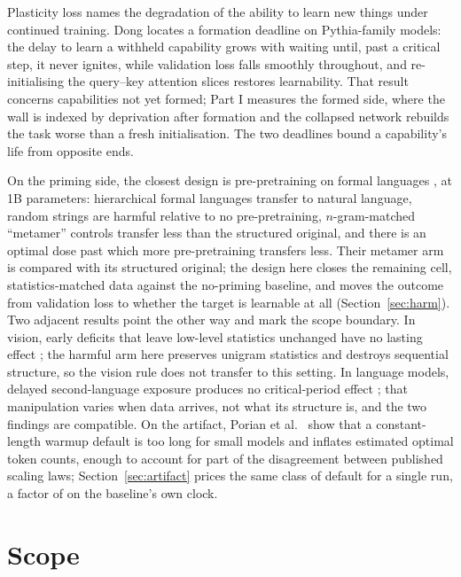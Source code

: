 \documentclass{article}
\begin{document}
Plasticity loss \cite{dohare2023, lyle2023} names the degradation of the ability to learn
new things under continued training. Dong \cite{dong2026} locates a formation deadline on
Pythia-family models: the delay to learn a withheld capability grows with waiting until,
past a critical step, it never ignites, while validation loss falls smoothly throughout,
and re-initialising the query--key attention slices restores learnability. That result
concerns capabilities not yet formed; Part I measures the formed side, where the wall is
indexed by deprivation after formation and the collapsed network rebuilds the task worse
than a fresh initialisation. The two deadlines bound a capability's life from opposite
ends.

On the priming side, the closest design is pre-pretraining on formal languages
\cite{hu2025}, at 1B parameters: hierarchical formal languages transfer to natural
language, random strings are harmful relative to no pre-pretraining, $n$-gram-matched
``metamer'' controls transfer less than the structured original, and there is an optimal
dose past which more pre-pretraining transfers less. Their metamer arm is compared with its
structured original; the design here closes the remaining cell, statistics-matched data
against the no-priming baseline, and moves the outcome from validation loss to whether the
target is learnable at all (Section~\ref{sec:harm}). Two adjacent results point the other
way and mark the scope boundary. In vision, early deficits that leave low-level statistics
unchanged have no lasting effect \cite{achille2019}; the harmful arm here preserves unigram
statistics and destroys sequential structure, so the vision rule does not transfer to this
setting. In language models, delayed second-language exposure produces no critical-period
effect \cite{constantinescu2024}; that manipulation varies when data arrives, not what its
structure is, and the two findings are compatible. On the artifact, Porian et al.\ \cite{porian2024} show
that a constant-length warmup default is too long for small models and inflates estimated
optimal token counts, enough to account for part of the disagreement between published
scaling laws; Section~\ref{sec:artifact} prices the same class of default for a single run,
a factor of \WuRatio{} on the baseline's own clock.

\section{Scope}
\label{sec:limits}
\end{document}
